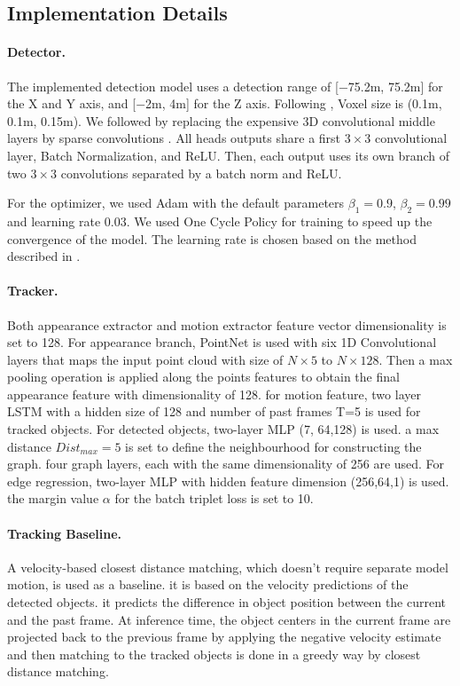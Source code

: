 \documentclass[10pt,twocolumn,letterpaper]{article}
\begin{document}
\subsection{Implementation Details}

\paragraph{Detector.} The implemented detection model uses a detection range of [$-$75.2m, 75.2m] for the X and Y axis, and [$-$2m, 4m] for the Z axis. Following \cite{cite PV-RCNN}, Voxel size is (0.1m, 0.1m, 0.15m). We followed \cite{yan2018second, yin2020center} by replacing the expensive 3D convolutional middle layers by sparse convolutions \cite{graham20183d}. All heads outputs share a first $3 \times 3$ convolutional layer, Batch Normalization, and ReLU. Then, each output uses its own branch of two $3\times 3$ convolutions separated by a batch norm and ReLU.

For the optimizer, we used Adam with the default parameters $\beta_{1} = 0.9$, $\beta_{2} = 0.99$ and learning rate 0.03. We used One Cycle Policy \cite{smith2017cyclical} for training to speed up the convergence of the model. The learning rate is chosen based on the method described in \cite{smith2017cyclical}.

\paragraph{Tracker.} Both appearance extractor and motion extractor feature vector dimensionality is set to 128. For appearance branch, PointNet is used with six 1D Convolutional layers that maps the input point cloud with size of $N \times 5$ to $N \times 128$. Then a max pooling operation is applied along the points features to obtain the final appearance feature with dimensionality of 128. for motion feature, two layer LSTM with a hidden size of 128 and number of past frames T=5 is used for tracked objects. For detected objects, two-layer MLP (7, 64,128) is used. a max distance $Dist_{max}=5$ is set to define the neighbourhood for constructing the graph. four graph layers, each with the same dimensionality of 256 are used. For edge regression, two-layer MLP with hidden feature dimension (256,64,1) is used. the margin value $\alpha$ for the batch triplet loss is set to 10.


\paragraph{Tracking Baseline.} A velocity-based closest distance matching, which doesn't require separate model motion, is used as a baseline. it is based on the velocity predictions of the detected objects. it predicts the difference in object position between the current and the past frame. At inference time, the object centers in the current frame are projected back to the previous frame by applying the negative velocity estimate and then matching to the tracked objects is done in a greedy way by closest distance matching.
\end{document}
